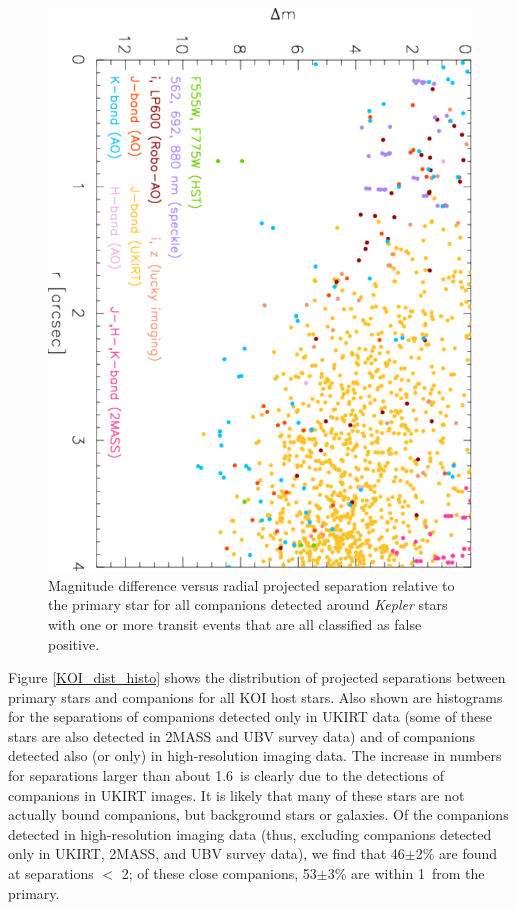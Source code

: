 \documentclass[twocolumn,appendixfloats]{aastex6}
\begin{document}
\begin{figure}[!t]
\centering
\includegraphics[angle=90, scale=0.54]{KOI_false-positives_imaging.pdf}
\caption{Magnitude difference versus radial projected separation relative to the
primary star for all companions detected around {\it Kepler} stars with one or
more transit events that are all classified as false positive. 
 \label{KOI_FPs_delta_m_radius}}
\end{figure}

Figure \ref{KOI_dist_histo} shows the distribution of projected separations 
between primary stars and companions for all KOI host stars. Also
shown are histograms for the separations of companions detected
only in UKIRT data (some of these stars are also detected in 2MASS
and UBV survey data) and of companions detected also (or only) in
high-resolution imaging data. The increase in numbers for separations 
larger than about 1.6\arcsec\ is clearly due to the detections of 
companions in UKIRT images. It is likely that many of these stars are
not actually bound companions, but background stars or galaxies.
Of the companions detected in high-resolution imaging data (thus,
excluding companions detected only in UKIRT, 2MASS, and UBV 
survey data), we find that 46$\pm$2\% are found at separations 
$<$ 2\arcsec; of these close companions, 53$\pm$3\% are within 
1\arcsec\ from the primary.
\end{document}
